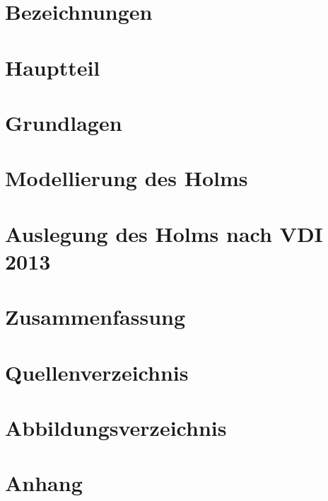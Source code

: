 \documentclass[a4paper,11pt]{article}
\begin{document}



\tableofcontents
\section{Bezeichnungen}

\section{Hauptteil}

\section{Grundlagen}

\section{Modellierung des Holms}


\section{Auslegung des Holms nach VDI 2013}

\section{Zusammenfassung}

\section{Quellenverzeichnis}

\section{Abbildungsverzeichnis}

\section{Anhang}

\end{document}
